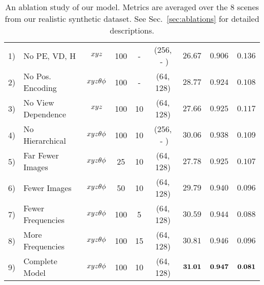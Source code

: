 \begin{table}[t]
\begin{tabular}{@{\,}l@{\,\,}l|cccc|ccc@{\,}}
1) & No PE, VD, H & $xyz$ & 100 & -  & (256, \,\,-\,\,)    &  $26.67$ & $0.906$ & $0.136$  \\
2) & No Pos. Encoding & $xyz\theta\phi$  & 100 & -  &  (64, 128)     &  $28.77$ & $0.924$ & $0.108$  \\
3) & No View Dependence & $xyz$ & 100 & 10 &  (64, 128)    &  $27.66$ & $0.925$ & $0.117$  \\
4) & No Hierarchical & $xyz\theta\phi$ & 100 & 10 & (256, \,\,-\,\,) &  $30.06$ & $0.938$ & $0.109$  \\
\arrayrulecolor{gray}
\hline
\arrayrulecolor{black}
5) & Far Fewer Images & $xyz\theta\phi$  & 25  & 10 &  (64, 128)     &  $27.78$ & $0.925$ & $0.107$  \\
6) & Fewer Images  & $xyz\theta\phi$  & 50  & 10 &  (64, 128)        &  $29.79$ & $0.940$ & $0.096$  \\
\arrayrulecolor{gray}
\hline
\arrayrulecolor{black}
7) & Fewer Frequencies & $xyz\theta\phi$ & 100 & 5  &  (64, 128)     &  $30.59$ & $0.944$ & $0.088$  \\
8) & More Frequencies & $xyz\theta\phi$ & 100 & 15 &  (64, 128)      &  $30.81$ & $0.946$ & $0.096$  \\
\arrayrulecolor{gray}
\hline
\arrayrulecolor{black}
9) & Complete Model & $xyz\theta\phi$ & 100 & 10 & (64, 128)         &  ${\mathbf{31.01}}$ & ${\mathbf{0.947}}$ & ${\mathbf{0.081}}$ 
\end{tabular}\vspace{2mm}
\caption{An ablation study of our model. Metrics are averaged over the 8 scenes from our realistic synthetic dataset. See Sec.~\ref{sec:ablations} for detailed descriptions.
}
\label{table:ablations}
\end{table}
\setlength{\tabcolsep}{1.4pt}